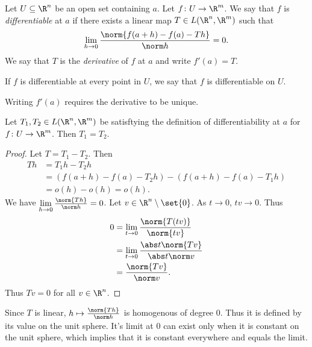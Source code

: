 
\begin{definition*}
    Let $U \subseteq \R^n$ be an open set containing $a$.
    Let $f\colon U \to \R^m$.
    We say that $f$ is \emph{differentiable} at $a$ if there exists a
    linear map $T \in L(\R^n, \R^m)$ such that \[
        \lim_{h \to 0} \frac{\norm{f(a + h) - f(a) - Th}}{\norm h} = 0.
    \]
    We say that $T$ is the \emph{derivative} of $f$ at $a$ and write
    $f'(a) = T$.

    If $f$ is differentiable at every point in $U$, we say that $f$ is
    differentiable on $U$.
\end{definition*}
Writing $f'(a)$ requires the derivative to be unique.
\begin{proposition}
    Let $T_1, T_2 \in L(\R^n, \R^m)$ be satisftying the definition of
    differentiability at $a$ for $f\colon U \to \R^m$.
    Then $T_1 = T_2$.
\end{proposition}
\begin{proof}
    Let $T = T_1 - T_2$.
    Then \begin{align*}
        Th &= T_1h - T_2h \\
            &= (f(a + h) - f(a) - T_2h) - (f(a + h) - f(a) - T_1h) \\
            &= o(h) - o(h) = o(h).
    \end{align*}
    We have $\lim\limits_{h \to 0} \frac{\norm{Th}}{\norm h} = 0$.
    Let $v \in \R^n \setminus \set{0}$.
    As $t \to 0$, $tv \to 0$.
    Thus \begin{align*}
        0 &= \lim_{t \to 0} \frac{\norm{T(tv)}}{\norm{tv}} \\
            &= \lim_{t \to 0} \frac{\abs t \norm{Tv}}{\abs t \norm v} \\
            &= \frac{\norm{Tv}}{\norm v}.
    \end{align*}
    Thus $Tv = 0$ for all $v \in \R^n$.
\end{proof}
\begin{remark}
    Since $T$ is linear,
    $h \mapsto \frac{\norm{Th}}{\norm h}$ is homogenous of degree $0$.
    Thus it is defined by its value on the unit sphere.
    It's limit at $0$ can exist only when it is constant on the unit sphere,
    which implies that it is constant everywhere and equals the limit.
\end{remark}


